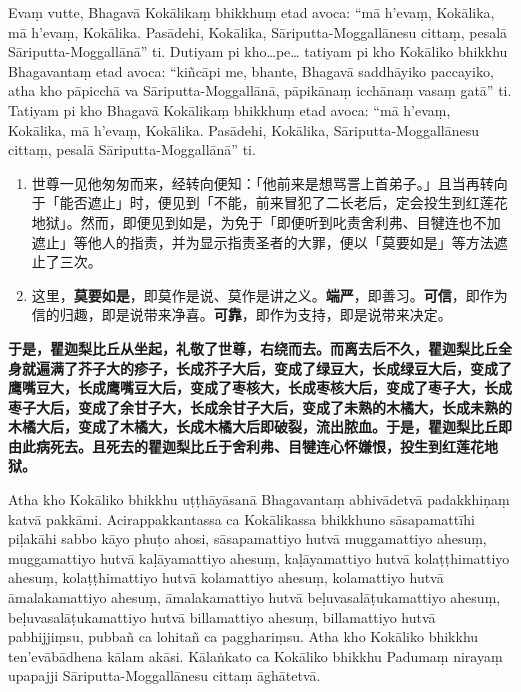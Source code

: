 Evaṃ vutte, Bhagavā Kokālikaṃ bhikkhuṃ etad avoca: “mā h’evaṃ, Kokālika, mā h’evaṃ, Kokālika. Pasādehi, Kokālika, Sāriputta-Moggallānesu cittaṃ, pesalā Sāriputta-Moggallānā” ti. Dutiyam pi kho…pe… tatiyam pi kho Kokāliko bhikkhu Bhagavantaṃ etad avoca: “kiñcāpi me, bhante, Bhagavā saddhāyiko paccayiko, atha kho pāpicchā va Sāriputta-Moggallānā, pāpikānaṃ icchānaṃ vasaṃ gatā” ti. Tatiyam pi kho Bhagavā Kokālikaṃ bhikkhuṃ etad avoca: “mā h’evaṃ, Kokālika, mā h’evaṃ, Kokālika. Pasādehi, Kokālika, Sāriputta-Moggallānesu cittaṃ, pesalā Sāriputta-Moggallānā” ti.

\begin{enumerate}\item 世尊一见他匆匆而来，经转向便知：「他前来是想骂詈上首弟子。」且当再转向于「能否遮止」时，便见到「不能，前来冒犯了二长老后，定会投生到红莲花地狱」。然而，即便见到如是，为免于「即便听到叱责舍利弗、目犍连也不加遮止」等他人的指责，并为显示指责圣者的大罪，便以「莫要如是」等方法遮止了三次。
\item 这里，\textbf{莫要如是}，即莫作是说、莫作是讲之义。\textbf{端严}，即善习。\textbf{可信}，即作为信的归趣，即是说带来净喜。\textbf{可靠}，即作为支持，即是说带来决定。\end{enumerate}

\textbf{于是，瞿迦梨比丘从坐起，礼敬了世尊，右绕而去。而离去后不久，瞿迦梨比丘全身就遍满了芥子大的疹子，长成芥子大后，变成了绿豆大，长成绿豆大后，变成了鹰嘴豆大，长成鹰嘴豆大后，变成了枣核大，长成枣核大后，变成了枣子大，长成枣子大后，变成了余甘子大，长成余甘子大后，变成了未熟的木橘大，长成未熟的木橘大后，变成了木橘大，长成木橘大后即破裂，流出脓血。于是，瞿迦梨比丘即由此病死去。且死去的瞿迦梨比丘于舍利弗、目犍连心怀嫌恨，投生到红莲花地狱。}

Atha kho Kokāliko bhikkhu uṭṭhāyāsanā Bhagavantaṃ abhivādetvā padakkhiṇaṃ katvā pakkāmi. Acirappakkantassa ca Kokālikassa bhikkhuno sāsapamattīhi piḷakāhi sabbo kāyo phuṭo ahosi, sāsapamattiyo hutvā muggamattiyo ahesuṃ, muggamattiyo hutvā kaḷāyamattiyo ahesuṃ, kaḷāyamattiyo hutvā kolaṭṭhimattiyo ahesuṃ, kolaṭṭhimattiyo hutvā kolamattiyo ahesuṃ, kolamattiyo hutvā āmalakamattiyo ahesuṃ, āmalakamattiyo hutvā beḷuvasalāṭukamattiyo ahesuṃ, beḷuvasalāṭukamattiyo hutvā billamattiyo ahesuṃ, billamattiyo hutvā pabhijjiṃsu, pubbañ ca lohitañ ca pagghariṃsu. Atha kho Kokāliko bhikkhu ten’evābādhena kālam akāsi. Kālaṅkato ca Kokāliko bhikkhu Padumaṃ nirayaṃ upapajji Sāriputta-Moggallānesu cittaṃ āghātetvā.

